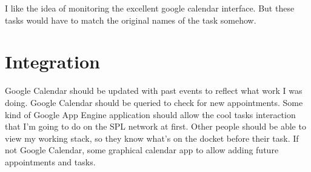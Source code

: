 \documentclass[12pt]{article}
\begin{document}
I like the idea of monitoring the excellent google calendar interface.  But these tasks
would have to match the original names of the task somehow.

\section{Integration}
Google Calendar should be updated with past events to reflect what work I was doing.
Google Calendar should be queried to check for new appointments.
Some kind of Google App Engine application should allow the cool tasks interaction
that I'm going to do on the SPL network at first.
Other people should be able to view my working stack, so they know what's on the docket
before their task.
If not Google Calendar, some graphical calendar app to allow adding future appointments
and tasks.
\end{document}
